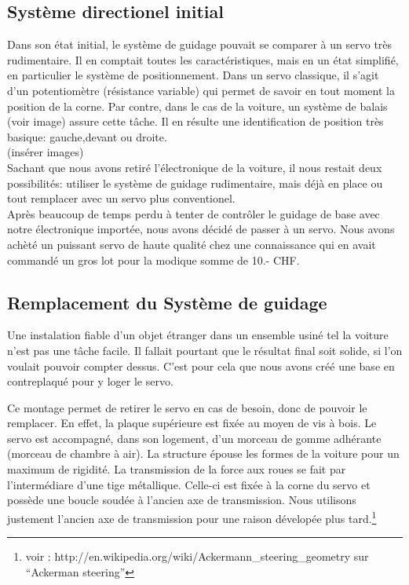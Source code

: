 \documentclass[a4paper,12pt]{report}
\begin{document}
{\subsection{Système directionel initial}
Dans son \'etat initial, le syst\`eme de guidage pouvait se comparer \`a un
servo tr\`es rudimentaire. Il en comptait toutes les caractéristiques, mais en
un état simplifié, en particulier le système de positionnement. Dans un servo
classique, il s'agit d'un potentiomètre (résistance variable) qui permet
de savoir en tout moment la position de la corne. Par contre, dans le cas de
la voiture, un système de balais (voir image) assure cette tâche. Il en
résulte une identification de position très basique: gauche,devant ou
droite.\\
(ins\'erer images)\\
Sachant que nous avons retir\'e l'\'electronique de la voiture, il nous restait
deux possibilit\'es: utiliser le syst\`eme de guidage rudimentaire, mais
d\'ej\`a en place ou tout remplacer avec un servo plus conventionel.\\
Apr\`es beaucoup de temps perdu \`a tenter de contr\^oler le guidage de base
avec notre \'electronique import\'ee, nous avons d\'ecidé de passer \`a un servo. Nous avons
ach\`eté un puissant servo de haute qualit\'e chez une connaissance qui en
avait command\'e un gros lot pour la modique somme de 10.- CHF.

\subsection{Remplacement du Système de guidage}
Une instalation fiable d'un objet \'etranger dans un ensemble usin\'e tel la
voiture n'est pas une t\^ache facile. Il fallait pourtant que le r\'esultat final
soit solide, si l'on voulait pouvoir compter dessus. C'est pour cela que nous avons
cr\'e\'e une base en contreplaqu\'e pour y loger le servo.

Ce montage permet de retirer le servo en cas de besoin, donc de pouvoir le
remplacer. En effet, la plaque sup\'erieure est fix\'ee au moyen de vis \`a
bois. Le servo est accompagn\'e, dans son logement, d'un morceau de gomme
adh\'erante (morceau de chambre \`a air). La structure \'epouse les formes de
la voiture pour un maximum de rigidit\'e. La transmission de la force aux
roues se fait par l'interm\'ediare d'une tige métallique. Celle-ci est
fix\'ee \`a la corne du servo et possède une boucle soud\'ee \`a l'ancien axe de
transmission. Nous utilisons justement l'ancien axe de transmission pour une
raison d\'evelop\'ee plus tard.\footnote{voir :
http://en.wikipedia.org/wiki/Ackermann\_steering\_geometry sur
``Ackerman steering''}

}
\end{document}
